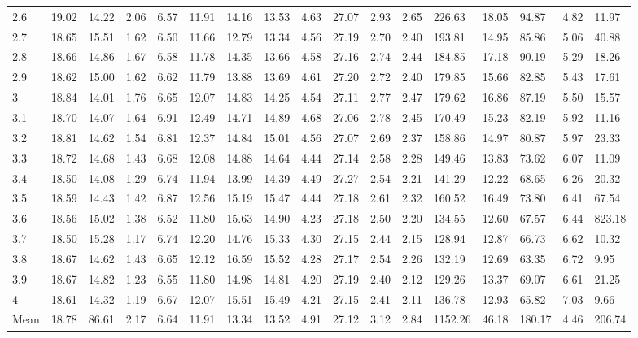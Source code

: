 \begin{adjustbox}{angle=90}
\begin{center}
\begin{tabular}{|l|llllllllllllllll|}
2.6&19.02&14.22&2.06&6.57&11.91&14.16&13.53&4.63&27.07&2.93&2.65&226.63&18.05&94.87&4.82&11.97  \\ 
2.7&18.65&15.51&1.62&6.50&11.66&12.79&13.34&4.56&27.19&2.70&2.40&193.81&14.95&85.86&5.06&40.88  \\ 
2.8&18.66&14.86&1.67&6.58&11.78&14.35&13.66&4.58&27.16&2.74&2.44&184.85&17.18&90.19&5.29&18.26  \\ 
2.9&18.62&15.00&1.62&6.62&11.79&13.88&13.69&4.61&27.20&2.72&2.40&179.85&15.66&82.85&5.43&17.61  \\ 
3&18.84&14.01&1.76&6.65&12.07&14.83&14.25&4.54&27.11&2.77&2.47&179.62&16.86&87.19&5.50&15.57  \\ 
3.1&18.70&14.07&1.64&6.91&12.49&14.71&14.89&4.68&27.06&2.78&2.45&170.49&15.23&82.19&5.92&11.16  \\ 
3.2&18.81&14.62&1.54&6.81&12.37&14.84&15.01&4.56&27.07&2.69&2.37&158.86&14.97&80.87&5.97&23.33  \\ 
3.3&18.72&14.68&1.43&6.68&12.08&14.88&14.64&4.44&27.14&2.58&2.28&149.46&13.83&73.62&6.07&11.09  \\ 
3.4&18.50&14.08&1.29&6.74&11.94&13.99&14.39&4.49&27.27&2.54&2.21&141.29&12.22&68.65&6.26&20.32  \\ 
3.5&18.59&14.43&1.42&6.87&12.56&15.19&15.47&4.44&27.18&2.61&2.32&160.52&16.49&73.80&6.41&67.54  \\ 
3.6&18.56&15.02&1.38&6.52&11.80&15.63&14.90&4.23&27.18&2.50&2.20&134.55&12.60&67.57&6.44&823.18  \\ 
3.7&18.50&15.28&1.17&6.74&12.20&14.76&15.33&4.30&27.15&2.44&2.15&128.94&12.87&66.73&6.62&10.32  \\ 
3.8&18.67&14.62&1.43&6.65&12.12&16.59&15.52&4.28&27.17&2.54&2.26&132.19&12.69&63.35&6.72&9.95  \\ 
3.9&18.67&14.82&1.23&6.55&11.80&14.98&14.81&4.20&27.19&2.40&2.12&129.26&13.37&69.07&6.61&21.25  \\ 
4&18.61&14.32&1.19&6.67&12.07&15.51&15.49&4.21&27.15&2.41&2.11&136.78&12.93&65.82&7.03&9.66  \\ \hline \hline
Mean&18.78&86.61&2.17&6.64&11.91&13.34&13.52&4.91&27.12&3.12&2.84&1152.26&46.18&180.17&4.46&206.74  \\ \hline
\end{tabular}
\end{center}
\end{adjustbox}





